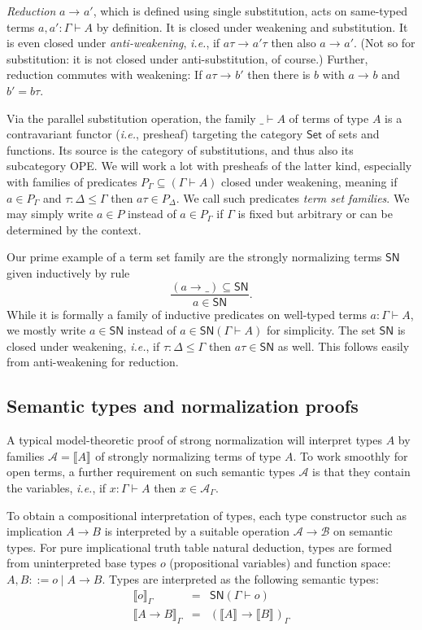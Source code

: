 \documentclass[a4paper,USenglish,cleveref, autoref, thm-restate]{lipics-v2019}
\newcommand{\ie}{\emph{i.e.}\xspace}
\newcommand{\den}[2][]{\llbracket#2\rrbracket^{#1}}
\newcommand{\ru}{\dfrac}
\newcommand{\Den}[2]{\den{#1}_{#2}}
\newcommand{\Set}{\mathsf{Set}}
\newcommand{\red}[1][]{\longrightarrow_{#1}}
\newcommand{\A}{\mathcal{A}}
\newcommand{\B}{\mathcal{B}}
\newcommand{\SN}{\mathsf{SN}}
\begin{document}
\emph{Reduction} $a \red a'$, which is defined using single substitution,
acts on same-typed terms
$a,a' : \Gamma \vdash A$ by definition.  It is closed under weakening
and substitution.  It is even closed under \emph{anti-weakening}, \ie,
if $a\tau \red a'\tau$ then also $a \red a'$.  (Not so for
substitution: it is not closed under anti-substitution, of course.)
Further, reduction commutes with weakening:  If $a\tau \red b'$ then there is
$b$ with $a \red b$ and $b' = b\tau$.

Via the parallel substitution operation, the family $\_ \vdash A$ of
terms of type $A$ is a contravariant functor (\ie, presheaf) targeting the
category $\Set$ of sets and functions.
Its source is the category of
substitutions, and thus also its subcategory OPE.  We will work a
lot with presheafs of the latter kind, especially with families of
predicates $P_\Gamma \subseteq (\Gamma \vdash A)$ closed under
weakening, meaning if $a \in P_\Gamma$ and $\tau : \Delta \leq \Gamma$
then $a \tau \in P_\Delta$.  We call such predicates \emph{term set
  families}.
We may simply write $a \in P$ instead of $a \in P_\Gamma$ if $\Gamma$
is fixed but arbitrary or can be determined by the context.

Our prime example of a term set family are the strongly normalizing
terms $\SN$ given inductively by rule
\[
  \ru{(a \red \_) \subseteq \SN
    }{a \in \SN}
  .
\]
While it is formally a family of inductive predicates on well-typed terms
$a : \Gamma \vdash A$, we mostly write $a \in \SN$ instead of
$a \in \SN(\Gamma \vdash A)$ for simplicity.  The set $\SN$ is closed
under weakening, \ie, if $\tau : \Delta \leq \Gamma$ then
$a\tau \in \SN$ as well.  This follows easily from anti-weakening for
reduction.

\subsection{Semantic types and normalization proofs}

A typical model-theoretic proof of strong normalization will interpret
types $A$ by families $\A = \den A$ of strongly normalizing terms of type $A$.
To work smoothly for open terms, a further requirement on such
semantic types $\A$ is that they contain the variables, \ie,
if $x : \Gamma \vdash A$ then $x \in \A_\Gamma$.

To obtain a compositional interpretation of types, each type
constructor such as implication $A \to B$ is interpreted by a suitable
operation $\A \to \B$ on semantic types.
For pure implicational truth table natural deduction, types are formed
from uninterpreted base types $o$ (propositional variables) and
function space: $A,B ::= o \mid A \to B$.  Types are interpreted as
the following semantic types:
\[
\begin{array}{lll}
  \Den o \Gamma & = & \SN(\Gamma \vdash o) \\
  \Den{A \to B} \Gamma & = & (\den A \to \den B)_\Gamma \\
\end{array}
\]
\end{document}
